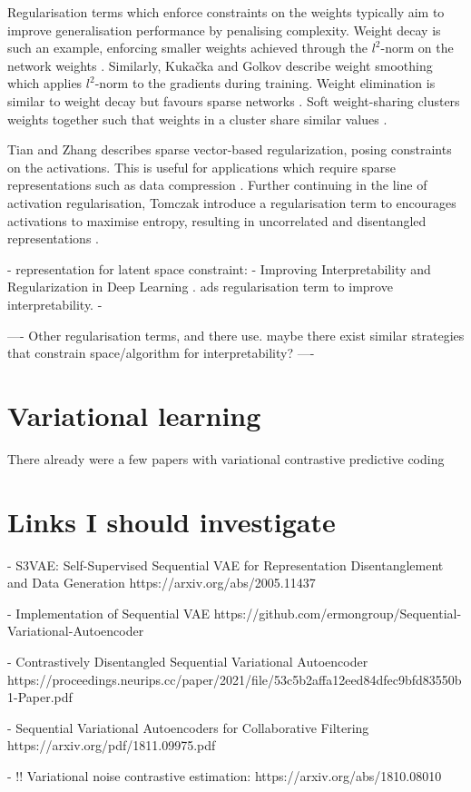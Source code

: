 	Regularisation terms which enforce constraints on the weights typically aim to improve generalisation performance by penalising complexity. Weight decay is such an example, enforcing smaller weights achieved through the $l^2$-norm on the network weights \cite{gneccoWeightdecayTechniqueLearning2009}. Similarly, Kukačka and Golkov describe weight smoothing which applies $l^2$-norm to the gradients during training. Weight elimination is similar to weight decay but favours sparse networks \cite{weigendGeneralizationWeightEliminationApplication1990}. Soft weight-sharing clusters weights together such that weights in a cluster share similar values \cite{nowlanSimplifyingNeuralNetworks1992}.
	
	Tian and Zhang describes sparse vector-based regularization, posing constraints on the activations. This is useful for applications which require sparse representations such as data compression \cite{tianComprehensiveSurveyRegularization2022}. Further continuing in the line of activation regularisation, Tomczak introduce a regularisation term to encourages activations to maximise entropy, resulting in uncorrelated and disentangled representations \cite{tomczakLearningInformativeFeatures2016}.

	
	
	- representation for latent space constraint: \cite{geladaDeepMDPLearningContinuous2019}
	- Improving Interpretability and Regularization in Deep Learning \cite{wuImprovingInterpretabilityRegularization2018}. ads regularisation term to improve interpretability.
	- 
	
	
	
	
	----
		Other regularisation terms, and there use. maybe there exist similar strategies that constrain space/algorithm for interpretability?
	----	

\section{Variational learning}
There already were a few papers with variational contrastive predictive coding

\section{Links I should investigate}
- S3VAE: Self-Supervised Sequential VAE for Representation Disentanglement and Data Generation
https://arxiv.org/abs/2005.11437

- Implementation of Sequential VAE
https://github.com/ermongroup/Sequential-Variational-Autoencoder

- Contrastively Disentangled Sequential Variational Autoencoder
https://proceedings.neurips.cc/paper/2021/file/53c5b2affa12eed84dfec9bfd83550b1-Paper.pdf

- Sequential Variational Autoencoders for Collaborative Filtering
https://arxiv.org/pdf/1811.09975.pdf

- !! Variational noise contrastive estimation:
https://arxiv.org/abs/1810.08010